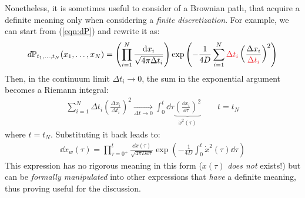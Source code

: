 \documentclass[../template.tex]{subfiles}
\begin{document}
\medskip

Nonetheless, it is sometimes useful to consider  of a Brownian path, that acquire a definite meaning only when considering a \textit{finite discretization}. For example, we can start from (\ref{eqn:dP}) and rewrite it as:
\begin{align*}
    d\mathbb{P}_{t_1, \dots, t_N} (x_1, \dots, x_N) = \left(\prod_{i=1}^N \frac{\dd{x_i}}{\sqrt{4 \pi \Delta t_i }}\right) \exp\left(-\frac{1}{4 D} \sum_{i=1}^N \textcolor{Red}{\Delta t_i} \left(\frac{\Delta x_i}{\textcolor{Red}{\Delta t_i}} \right)^2 \right) 
\end{align*}
Then, in the continuum limit $\Delta t_i \to 0$, the sum in the exponential argument becomes a Riemann integral:
\begin{align*}
    \sum_{i=1}^N \Delta t_i \left(\frac{\Delta x_i}{\Delta t_i} \right)^2 \xrightarrow[\Delta t \to 0]{} \int_0^t \dd{\tau} \underbrace{\left(\frac{\dd{x_i}}{\dd{\tau}} \right)^2}_{\dot{x}^2(\tau)}  \qquad t= t_N
\end{align*} 
where $t = t_N$. Substituting it back leads to:
\begin{align*}
    \dd{x_w}(\tau) = \prod_{\tau = 0^+}^t \frac{\dd{x}(\tau)}{\sqrt{4 \pi D \dd{\tau}}} \exp\left(-\frac{1}{4 D} \int_0^t \dot{x}^2 (\tau) \dd{\tau} \right) 
\end{align*}
This expression has no rigorous meaning in this form ($\dot{x}(\tau)$  \textit{does not} exists!) but can be \textit{formally manipulated} into other expressions that \textit{have} a definite meaning, thus proving useful for the discussion.  
\end{document}
